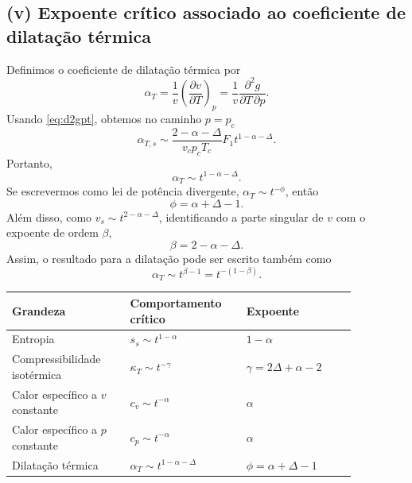 \documentclass[11pt,a4paper]{article}
\begin{document}
\subsection*{(v) Expoente crítico associado ao coeficiente de dilatação térmica}
% 
Definimos o coeficiente de dilatação térmica por
%
\begin{equation}
    \alpha_T
    =\frac{1}{v}\left(\frac{\partial v}{\partial T}\right)_p
    =\frac{1}{v}
    \frac{\partial^2g}{\partial T\,\partial p}.
\end{equation}
Usando \eqref{eq:d2gpt}, obtemos no caminho \(p=p_c\)
\begin{equation}
    \alpha_{T,s}
    \sim
    \frac{2-\alpha-\Delta}{v_cp_cT_c}
    F_1t^{1-\alpha-\Delta}.
\end{equation}
Portanto,
\begin{equation}
    \boxed{
    \alpha_T\sim t^{1-\alpha-\Delta}.
    }
    \label{eq:alphaT_scaling}
\end{equation}
Se escrevermos como lei de potência divergente, \(\alpha_T\sim t^{-\phi}\),
então
\begin{equation}
    \boxed{
    \phi=\alpha+\Delta-1.
    }
    \label{eq:phi}
\end{equation}
Além disso, como \(v_s\sim t^{2-\alpha-\Delta}\), identificando a parte
singular de \(v\) com o expoente de ordem \(\beta\),
\begin{equation}
    \boxed{
    \beta=2-\alpha-\Delta.
    }
    \label{eq:beta}
\end{equation}
Assim, o resultado para a dilatação pode ser escrito também como
\begin{equation}
    \boxed{
    \alpha_T\sim t^{\beta-1}=t^{-(1-\beta)}.
    }
\end{equation}
%
\begin{center}
\renewcommand{\arraystretch}{1.5}
\begin{tabular}{>{\centering\arraybackslash}m{0.30\linewidth}
                >{\centering\arraybackslash}m{0.28\linewidth}
                >{\centering\arraybackslash}m{0.28\linewidth}}
\toprule
\textbf{Grandeza} & \textbf{Comportamento crítico} & \textbf{Expoente}\\
\midrule
Entropia 
    & \(s_s\sim t^{1-\alpha}\)
    & \(1-\alpha\) \\
Compressibilidade isotérmica
    & \(\kappa_T\sim t^{-\gamma}\)
    & \(\boxed{\gamma=2\Delta+\alpha-2}\) \\
Calor específico a \(v\) constante
    & \(c_v\sim t^{-\alpha}\)
    & \(\boxed{\alpha}\) \\
Calor específico a \(p\) constante
    & \(c_p\sim t^{-\alpha}\)
    & \(\boxed{\alpha}\) \\
Dilatação térmica
    & \(\alpha_T\sim t^{1-\alpha-\Delta}\)
    & \(\boxed{\phi=\alpha+\Delta-1}\) \\
\bottomrule
\end{tabular}
\end{center}
\end{document}
